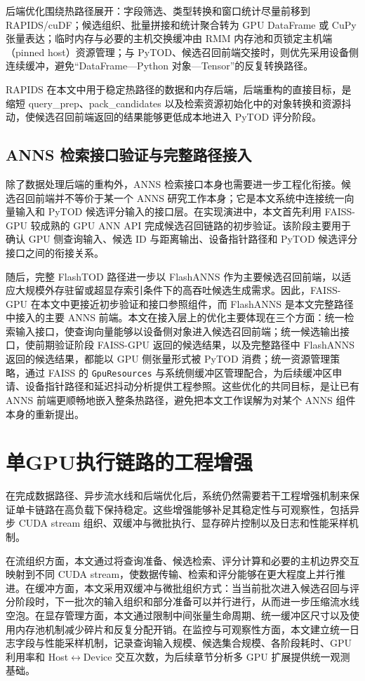 后端优化围绕热路径展开：字段筛选、类型转换和窗口统计尽量前移到 RAPIDS/cuDF；候选组织、批量拼接和统计聚合转为 GPU DataFrame 或 CuPy 张量表达；临时内存与必要的主机交换缓冲由 RMM 内存池和页锁定主机端（pinned host）资源管理；与 PyTOD、候选召回前端交接时，则优先采用设备侧连续缓冲，避免``DataFrame---Python 对象---Tensor''的反复转换路径\citep{rapids_rmm_pinned}。

RAPIDS 在本文中用于稳定热路径的数据和内存后端，后端重构的直接目标，是缩短 query\_prep、pack\_candidates 以及检索资源初始化中的对象转换和资源抖动，使候选召回前端返回的结果能够更低成本地进入 PyTOD 评分阶段。

\subsection{ANNS 检索接口验证与完整路径接入}

除了数据处理后端的重构外，ANNS 检索接口本身也需要进一步工程化衔接。候选召回前端并不等价于某一个 ANNS 研究工作本身；它是本文系统中连接统一向量输入和 PyTOD 候选评分输入的接口层。在实现演进中，本文首先利用 FAISS-GPU 较成熟的 GPU ANN API 完成候选召回链路的初步验证。该阶段主要用于确认 GPU 侧查询输入、候选 ID 与距离输出、设备指针路径和 PyTOD 候选评分接口之间的衔接关系。

随后，完整 FlashTOD 路径进一步以 FlashANNS 作为主要候选召回前端，以适应大规模外存驻留或超显存索引条件下的高吞吐候选生成需求。因此，FAISS-GPU 在本文中更接近初步验证和接口参照组件，而 FlashANNS 是本文完整路径中接入的主要 ANNS 前端。本文在接入层上的优化主要体现在三个方面：统一检索输入接口，使查询向量能够以设备侧对象进入候选召回前端；统一候选输出接口，使前期验证阶段 FAISS-GPU 返回的候选结果，以及完整路径中 FlashANNS 返回的候选结果，都能以 GPU 侧张量形式被 PyTOD 消费；统一资源管理策略，通过 FAISS 的 \texttt{GpuResources} 与系统侧缓冲区管理配合，为后续缓冲区申请、设备指针路径和延迟抖动分析提供工程参照\citep{faiss_gpu_wiki}。这些优化的共同目标，是让已有 ANNS 前端更顺畅地嵌入整条热路径，避免把本文工作误解为对某个 ANNS 组件本身的重新提出。

\section{单GPU执行链路的工程增强}

在完成数据路径、异步流水线和后端优化后，系统仍然需要若干工程增强机制来保证单卡链路在高负载下保持稳定。这些增强能够补足其稳定性与可观察性，包括异步 CUDA stream 组织、双缓冲与微批执行、显存碎片控制以及日志和性能采样机制。

在流组织方面，本文通过将查询准备、候选检索、评分计算和必要的主机边界交互映射到不同 CUDA stream，使数据传输、检索和评分能够在更大程度上并行推进。在缓冲方面，本文采用双缓冲与微批组织方式：当当前批次进入候选召回与评分阶段时，下一批次的输入组织和部分准备可以并行进行，从而进一步压缩流水线空泡。在显存管理方面，本文通过限制中间张量生命周期、统一缓冲区尺寸以及使用内存池机制减少碎片和反复分配开销。在监控与可观察性方面，本文建立统一日志字段与性能采样机制，记录查询输入规模、候选集合规模、各阶段耗时、GPU 利用率和 Host$\leftrightarrow$Device 交互次数，为后续章节分析多 GPU 扩展提供统一观测基础。

